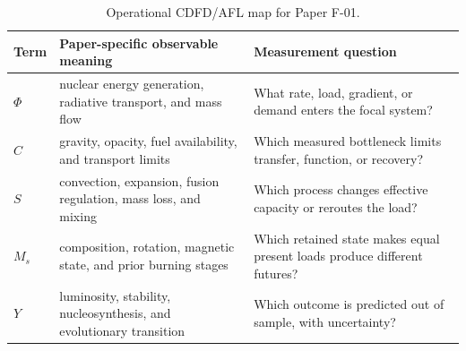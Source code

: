\documentclass[11pt,a4paper]{article}
\begin{document}
\begin{table}[htbp]
\centering
\small
\caption{Operational CDFD/AFL map for Paper F-01.}
\begin{tabularx}{\textwidth}{|l|X|X|}
\hline
\textbf{Term} & \textbf{Paper-specific observable meaning} & \textbf{Measurement question} \\
\hline
$\Phi$ & nuclear energy generation, radiative transport, and mass flow & What rate, load, gradient, or demand enters the focal system? \\
\hline
$C$ & gravity, opacity, fuel availability, and transport limits & Which measured bottleneck limits transfer, function, or recovery? \\
\hline
$S$ & convection, expansion, fusion regulation, mass loss, and mixing & Which process changes effective capacity or reroutes the load? \\
\hline
$M_s$ & composition, rotation, magnetic state, and prior burning stages & Which retained state makes equal present loads produce different futures? \\
\hline
$Y$ & luminosity, stability, nucleosynthesis, and evolutionary transition & Which outcome is predicted out of sample, with uncertainty? \\
\hline
\end{tabularx}
\end{table}
\end{document}
